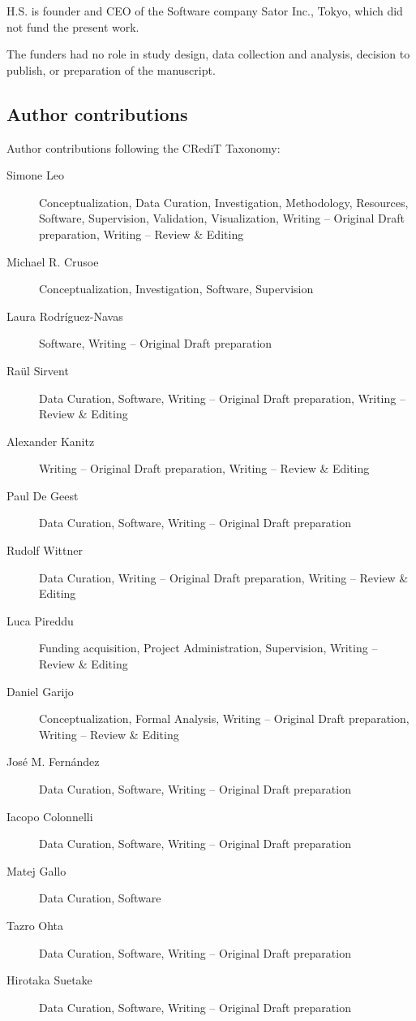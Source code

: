 \documentclass[10pt,letterpaper]{article}
\begin{document}
H.S. is founder and CEO of the Software company Sator Inc., Tokyo, which did not fund the present work.

The funders had no role in study design, data collection and analysis, decision to publish, or preparation of the manuscript.
\fi

\subsection*{Author contributions}
Author contributions following the CRediT Taxonomy:

\begin{description}
\item[Simone Leo]
Conceptualization, Data Curation, Investigation, Methodology, Resources, Software, Supervision, Validation, Visualization, Writing -- Original Draft preparation, Writing -- Review \& Editing
\item[Michael R. Crusoe]
Conceptualization, Investigation, Software, Supervision
\item[Laura Rodríguez-Navas]
Software, Writing -- Original Draft preparation
\item[Raül Sirvent]
Data Curation, Software, Writing -- Original Draft preparation, Writing -- Review \& Editing
\item[Alexander Kanitz]
Writing -- Original Draft preparation, Writing -- Review \& Editing
\item[Paul De Geest]
Data Curation, Software, Writing -- Original Draft preparation
\item[Rudolf Wittner]
Data Curation, Writing -- Original Draft preparation, Writing -- Review \& Editing
\item[Luca Pireddu]
Funding acquisition, Project Administration, Supervision, Writing -- Review \& Editing
\item[Daniel Garijo]
Conceptualization, Formal Analysis, Writing -- Original Draft preparation, Writing -- Review \& Editing
\item[José M. Fernández]
Data Curation, Software, Writing -- Original Draft preparation
\item[Iacopo Colonnelli]
Data Curation, Software, Writing -- Original Draft preparation
\item[Matej Gallo]
Data Curation, Software
\item[Tazro Ohta]
Data Curation, Software, Writing -- Original Draft preparation
\item[Hirotaka Suetake]
Data Curation, Software, Writing -- Original Draft preparation

\end{description}
\end{document}
